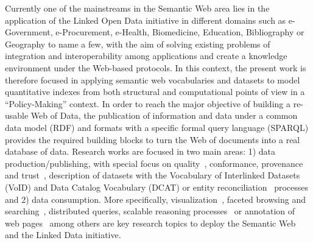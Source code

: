 % 
Currently one of the mainstreams in the Semantic Web area lies in the application of the Linked Open Data initiative in 
different domains such as  e-Government, e-Procurement, e-Health, Biomedicine, Education, Bibliography or Geography to name a few,  
with the aim of solving existing problems of integration and interoperability among applications and create a 
knowledge environment under the Web-based protocols. In this context, the present work is therefore focused 
in applying semantic web vocabularies and datasets to model quantitative indexes from both structural 
and computational points of view in a ``Policy-Making'' context. In order to reach the major objective of building a re-usable Web of Data,  
the publication of information and data under a common data model (RDF) and formats with 
a specific formal query language (SPARQL) provides the required building blocks to turn 
the Web of documents into a real database of data. Research works are focused in two main areas: 1) data production/publishing, 
with special focus on quality~\cite{Bizer:2009:QIF:1482178.1482280}, conformance, provenance and trust~\cite{w3c-prov}, description of datasets with the Vocabulary of Interlinked Datasets (VoID) 
and Data Catalog Vocabulary (DCAT) or entity reconciliation~\cite{Maali_Cyganiak_2011} processes and 2) data consumption. More specifically, visualization~\cite{DBLP:journals/semweb/DadzieR11}, 
faceted browsing and searching~\cite{hoga-etal-2011-swse-JWS}, distributed queries, scalable reasoning processes~\cite{DBLP:conf/semweb/HoganPPD10} or 
annotation of web pages~\cite{rdfa-primer} among others are key research topics to deploy the Semantic Web and the Linked Data initiative.

